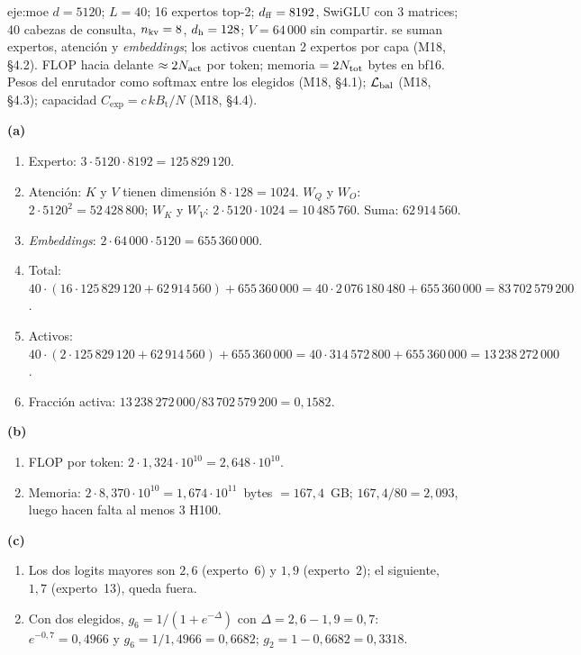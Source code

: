 \begin{solucion}{eje:moe}
\datos $d=5120$; $L=40$; 16 expertos top-2; $d_{\mathrm{ff}}=8192$, SwiGLU con 3 matrices; 40 cabezas de consulta, $n_{\mathrm{kv}}=8$, $d_{\mathrm{h}}=128$; $V=64\,000$ sin compartir.
\planteamiento se suman expertos, atención y \emph{embeddings}; los activos cuentan 2 expertos por capa (M18, §4.2). FLOP hacia delante $\approx 2N_{\mathrm{act}}$ por token; memoria $=2N_{\mathrm{tot}}$ bytes en bf16. Pesos del enrutador como softmax entre los elegidos (M18, §4.1); $\mathcal{L}_{\mathrm{bal}}$ (M18, §4.3); capacidad $C_{\mathrm{exp}}=c\,kB_{\mathrm{t}}/N$ (M18, §4.4).
\pasos

\noindent\textbf{(a)}
\begin{enumerate}[label=\arabic*.]
  \item Experto: $3\cdot 5120\cdot 8192=125\,829\,120$.
  \item Atención: $K$ y $V$ tienen dimensión $8\cdot 128=1024$. $W_Q$ y $W_O$: $2\cdot 5120^{2}=52\,428\,800$; $W_K$ y $W_V$: $2\cdot 5120\cdot 1024=10\,485\,760$. Suma: $62\,914\,560$.
  \item \emph{Embeddings}: $2\cdot 64\,000\cdot 5120=655\,360\,000$.
  \item Total: $40\cdot(16\cdot 125\,829\,120+62\,914\,560)+655\,360\,000=40\cdot 2\,076\,180\,480+655\,360\,000=83\,702\,579\,200$.
  \item Activos: $40\cdot(2\cdot 125\,829\,120+62\,914\,560)+655\,360\,000=40\cdot 314\,572\,800+655\,360\,000=13\,238\,272\,000$.
  \item Fracción activa: $13\,238\,272\,000/83\,702\,579\,200=0{,}1582$.
\end{enumerate}

\noindent\textbf{(b)}
\begin{enumerate}[label=\arabic*.]
  \item FLOP por token: $2\cdot 1{,}324\cdot 10^{10}=2{,}648\cdot 10^{10}$.
  \item Memoria: $2\cdot 8{,}370\cdot 10^{10}=1{,}674\cdot 10^{11}$~bytes $=167{,}4$~GB; $167{,}4/80=2{,}093$, luego hacen falta al menos 3 H100.
\end{enumerate}

\noindent\textbf{(c)}
\begin{enumerate}[label=\arabic*.]
  \item Los dos logits mayores son $2{,}6$ (experto~6) y $1{,}9$ (experto~2); el siguiente, $1{,}7$ (experto~13), queda fuera.
  \item Con dos elegidos, $g_6=1/(1+e^{-\Delta})$ con $\Delta=2{,}6-1{,}9=0{,}7$: $e^{-0{,}7}=0{,}4966$ y $g_6=1/1{,}4966=0{,}6682$; $g_2=1-0{,}6682=0{,}3318$.
\end{enumerate}


\end{solucion}
